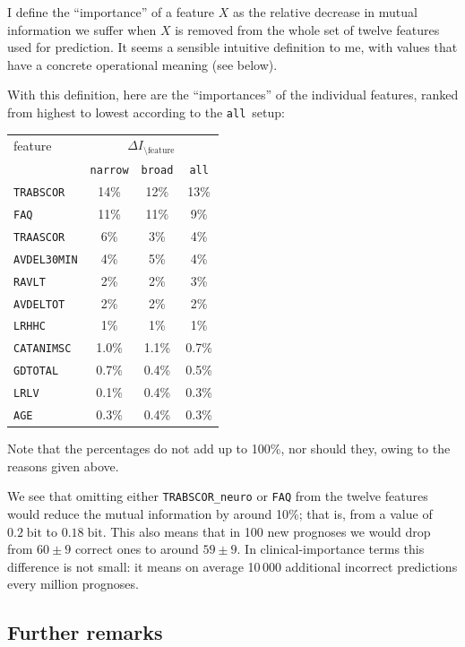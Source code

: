 \documentclass[\ifafour a4paper,12pt,\else a5paper,10pt,\fi%
onecolumn,oneside,article,%
british%
]{memoir}
\theoremstyle{remark}
\theoremstyle{innote}
\renewcommand*{\|}[1][]{\nonscript\:#1\vert\nonscript\:\mathopen{}}
\newcommand*{\bit}{\textrm{bit}}
\newcommand*{\narrow}{\texttt{narrow}}
\newcommand*{\broad}{\texttt{broad}}
\newcommand*{\all}{\texttt{all}}
\begin{document}
I define the \enquote{importance} of a feature $X$ as the relative decrease
in mutual information we suffer when $X$ is removed from the whole set of
twelve features used for prediction. It seems a sensible intuitive definition to
me, with values that have a concrete operational meaning (see below).

With this definition, here are the \enquote{importances} of the individual features,
ranked from highest to lowest according to the \all\ setup:
\begin{center}
  \begin{tabular}[c]{l|ccc}
    feature &\multicolumn{3}{c}{$\Delta I_{\setminus\text{feature}}$} \\
    & \narrow & \broad & \all \\
\hline
\texttt{TRABSCOR} & 14\% & 12\% & 13\%\\
\texttt{FAQ} & 11\% & 11\% & 9\%\\
\texttt{TRAASCOR} & 6\% & 3\% & 4\%\\
\texttt{AVDEL30MIN} & 4\% & 5\% & 4\%\\
\texttt{RAVLT} & 2\% & 2\% & 3\%\\
\texttt{AVDELTOT} & 2\% & 2\% & 2\%\\
\texttt{LRHHC} & 1\% & 1\% & 1\%\\
\texttt{CATANIMSC} & 1.0\% & 1.1\% & 0.7\%\\
\texttt{GDTOTAL} & 0.7\% & 0.4\% & 0.5\%\\
\texttt{LRLV} & 0.1\% & 0.4\% & 0.3\%\\
\texttt{AGE} & 0.3\% & 0.4\% & 0.3\%
  \end{tabular}
\end{center}
Note that the percentages do not add up to 100\%, nor should they, owing to
the reasons given above.

We see that omitting either \texttt{TRABSCOR\_neuro} or \texttt{FAQ} from
the twelve features would reduce the mutual information by around
10\%; that is, from a value of $0.2\;\bit$ to $0.18\;\bit$. This also
means that in 100 new prognoses we would drop from $60\pm 9$ correct ones
to around $59\pm 9$. In clinical-importance terms this difference is not
small: it means on average 10\,000 additional incorrect predictions every
million prognoses.

\subsection{Further remarks}
\label{sec:remarks}
\end{document}
